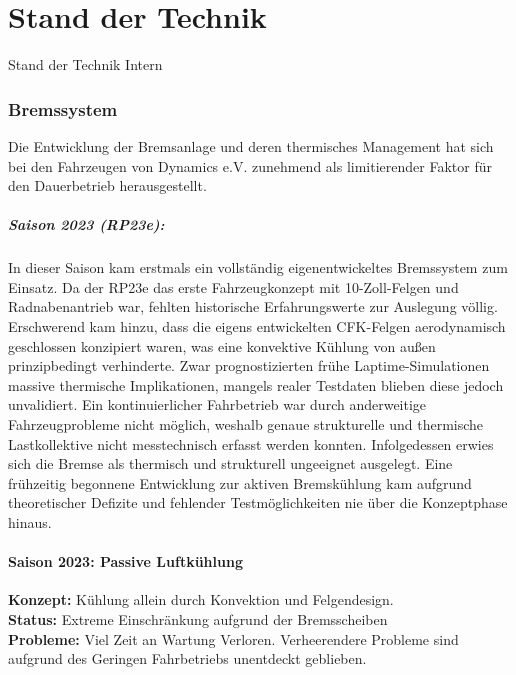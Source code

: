 \chapter{Stand der Technik}
Stand der Technik Intern

\subsection{Bremssystem}
\label{subsec:bremsen_status}

Die Entwicklung der Bremsanlage und deren thermisches Management hat sich bei den Fahrzeugen von Dynamics e.V. zunehmend als limitierender Faktor für den Dauerbetrieb herausgestellt.

\paragraph{Saison 2023 (RP23e):} 
In dieser Saison kam erstmals ein vollständig eigenentwickeltes Bremssystem zum Einsatz. Da der RP23e das erste Fahrzeugkonzept mit 10-Zoll-Felgen und Radnabenantrieb war, fehlten historische Erfahrungswerte zur Auslegung völlig. Erschwerend kam hinzu, dass die eigens entwickelten CFK-Felgen aerodynamisch geschlossen konzipiert waren, was eine konvektive Kühlung von außen prinzipbedingt verhinderte. Zwar prognostizierten frühe Laptime-Simulationen massive thermische Implikationen, mangels realer Testdaten blieben diese jedoch unvalidiert. Ein kontinuierlicher Fahrbetrieb war durch anderweitige Fahrzeugprobleme nicht möglich, weshalb genaue strukturelle und thermische Lastkollektive nicht messtechnisch erfasst werden konnten. Infolgedessen erwies sich die Bremse als thermisch und strukturell ungeeignet ausgelegt. Eine frühzeitig begonnene Entwicklung zur aktiven Bremskühlung kam aufgrund theoretischer Defizite und fehlender Testmöglichkeiten nie über die Konzeptphase hinaus.

\subsubsection{Saison 2023: Passive Luftkühlung}
\textbf{Konzept:} Kühlung allein durch Konvektion und Felgendesign. \\
\textbf{Status:} Extreme Einschränkung aufgrund der Bremsscheiben  \\
\textbf{Probleme:} Viel Zeit an Wartung Verloren. Verheerendere Probleme sind aufgrund des Geringen Fahrbetriebs unentdeckt geblieben.


